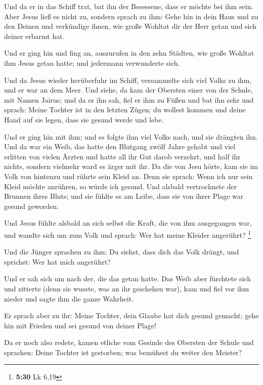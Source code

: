  Und da er in das Schiff trat, bat ihn der Besessene,
dass er möchte bei ihm sein.  Aber Jesus ließ es nicht
zu, sondern sprach zu ihm: Gehe hin in dein Haus und zu den Deinen und
verkündige ihnen, wie große Wohltat dir der Herr getan und sich deiner
erbarmt hat.

 Und er ging hin und fing an, auszurufen in den zehn
Städten, wie große Wohltat ihm Jesus getan hatte; und jedermann
verwunderte sich.

 Und da Jesus wieder herüberfuhr im Schiff, versammelte
sich viel Volks zu ihm, und er war an dem Meer.  Und
siehe, da kam der Obersten einer von der Schule, mit Namen Jairus; und
da er ihn sah, fiel er ihm zu Füßen  und bat ihn sehr und
sprach: Meine Tochter ist in den letzten Zügen; du wollest kommen und
deine Hand auf sie legen, dass sie gesund werde und lebe.

 Und er ging hin mit ihm; und es folgte ihm viel Volks
nach, und sie drängten ihn.  Und da war ein Weib, das
hatte den Blutgang zwölf Jahre gehabt  und viel erlitten
von vielen Ärzten und hatte all ihr Gut darob verzehrt, und half ihr
nichts, sondern vielmehr ward es ärger mit ihr.  Da die
von Jesu hörte, kam sie im Volk von hintenzu und rührte sein Kleid an.
 Denn sie sprach: Wenn ich nur sein Kleid möchte
anrühren, so würde ich gesund.  Und alsbald vertrocknete
der Brunnen ihres Bluts; und sie fühlte es am Leibe, dass sie von ihrer
Plage war gesund geworden.

 Und Jesus fühlte alsbald an sich selbst die Kraft, die
von ihm ausgegangen war, und wandte sich um zum Volk und sprach: Wer hat
meine Kleider angerührt? \footnote{\textbf{5:30} Lk 6,19}

 Und die Jünger sprachen zu ihm: Du siehst, dass dich das
Volk drängt, und sprichst: Wer hat mich angerührt?

 Und er sah sich um nach der, die das getan hatte.
 Das Weib aber fürchtete sich und zitterte (denn sie
wusste, was an ihr geschehen war), kam und fiel vor ihm nieder und sagte
ihm die ganze Wahrheit.

 Er sprach aber zu ihr: Meine Tochter, dein Glaube hat
dich gesund gemacht; gehe hin mit Frieden und sei gesund von deiner
Plage!

 Da er noch also redete, kamen etliche vom Gesinde des
Obersten der Schule und sprachen: Deine Tochter ist gestorben; was
bemühest du weiter den Meister?

